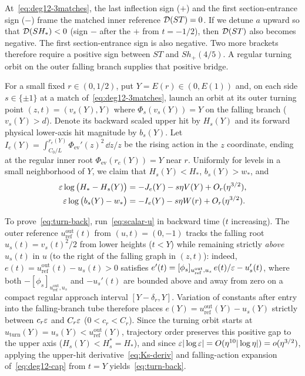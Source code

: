 At~\eqref{eq:deg12-3matches}, the last inflection sign ($+$) and the first section-entrance sign ($-$) frame the matched inner reference $\mathcal{D}(ST)=0$. If we detune $a$ upward so that $\mathcal{D}(SH_*)<0$ (sign $-$ after the $+$ from $t=-1/2$), then $\mathcal{D}(ST)$ also becomes negative. The first section-entrance sign is also negative. Two more brackets
therefore require a positive sign between $ST$ and $S h_+(4/5)$. A regular turning orbit on the outer falling branch supplies that positive bridge.

For a small fixed $r\in(0,1/2)$, put $Y=E(r)\in(0,E(1))$ and, on each side $s\in\{\pm 1\}$ at a match of~\eqref{eq:deg12-3matches}, launch an orbit at its outer turning point $(z,t)=(v_s(Y),Y)$ where $\Phi_s(v_s(Y))=Y$ on the falling branch ($v_s(Y)>d$). Denote its backward scaled upper hit by $H_s(Y)$ and its forward physical lower-axis hit magnitude by $b_s(Y)$. Let $I_e(Y)=\int_{C_0/L}^{r_e(Y)}\Phi_{\mathrm{ev}}'(z)^2\,\dd z/z$ be the rising action in the $z$ coordinate, ending at the regular inner root $\Phi_{\mathrm{ev}}(r_e(Y))=Y$ near $r$. Uniformly for levels in a small neighborhood of $Y$, we claim that $H_s(Y)<H_*$, $b_s(Y)>w_*$, and
\begin{align}
  \varepsilon\log\big(H_* - H_s(Y)\big) &= -J_e(Y) - s\eta V(Y) + O_r(\eta^{3/2}),\label{eq:turn-back}\\
  \varepsilon\log\big(b_s(Y) - w_*\big)  &= -I_e(Y) - s\eta W(r) + O_r(\eta^{3/2}).\label{eq:turn-fwd}
\end{align}

To prove~\eqref{eq:turn-back}, run~\eqref{eq:scalar-u} in backward time ($t$ increasing). The outer reference $u_{\mathrm{ref}}^{\mathrm{out}}(t)$ from $(u,t)=(0,-1)$ tracks the falling root $u_s(t)=v_s(t)^2/2$ from lower heights ($t<Y$) while remaining strictly \emph{above} $u_s(t)$ in $u$ (to the right of the falling graph in $(z,t)$): indeed, $e(t)=u_{\mathrm{ref}}^{\mathrm{out}}(t)-u_s(t)>0$ satisfies $e'(t)=[\phi_s]_{u_{\mathrm{ref}}^{\mathrm{out}},u_s}\,e(t)/\varepsilon - u_s'(t)$, where both $-[\phi_s]_{u_{\mathrm{ref}}^{\mathrm{out}},u_s}$ and $-u_s'(t)$ are bounded above and away from zero on a compact regular approach interval $[Y-\delta_r,Y]$. Variation of constants after entry into the falling-branch tube therefore places $e(Y)=u_{\mathrm{ref}}^{\mathrm{out}}(Y)-u_s(Y)$ strictly between $c_r\varepsilon$ and $C_r\varepsilon$ ($0<c_r<C_r$). Since the turning orbit starts at $u_{\mathrm{turn}}(Y)=u_s(Y)<u_{\mathrm{ref}}^{\mathrm{out}}(Y)$, trajectory order preserves this positive gap to the upper axis ($H_s(Y)<H_s^*=H_*$), and since $\varepsilon|\log\varepsilon|=O(\eta^{10}|\log\eta|)=o(\eta^{3/2})$, applying the upper-hit derivative~\eqref{eq:Ks-deriv} and falling-action expansion of~\eqref{eq:deg12-cap} from $t=Y$ yields~\eqref{eq:turn-back}.

